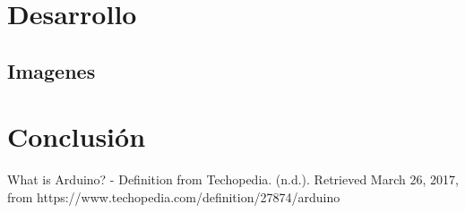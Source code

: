 \documentclass{article}
\begin{document}
\newpage
\section{Desarrollo}

\subsection{Imagenes}

\newpage
\section{Conclusión}

\renewcommand\refname{Referencias}
\begin{thebibliography}{1}
	 What is Arduino? - Definition from Techopedia. (n.d.). Retrieved March 26, 2017, from https://www.techopedia.com/definition/27874/arduino	
\end{thebibliography}
\end{document}
